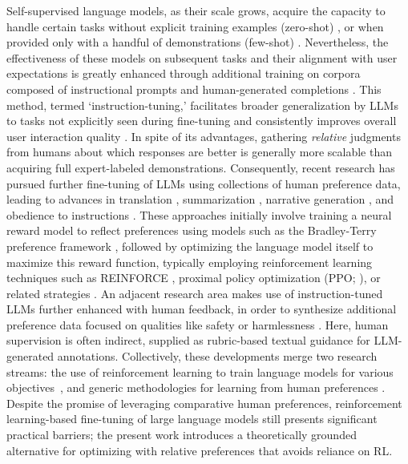 Self-supervised language models, as their scale grows, acquire the capacity to handle certain tasks without explicit training examples (zero-shot) \citep{radford2019language}, or when provided only with a handful of demonstrations (few-shot) \citep{gpt3,megatron,chowdhery2022palm}. Nevertheless, the effectiveness of these models on subsequent tasks and their alignment with user expectations is greatly enhanced through additional training on corpora composed of instructional prompts and human-generated completions \citep{mishra-etal-2022-cross,sanh2022multitask,chung2022scaling,thoppilan2022lamda}. This method, termed `instruction-tuning,’ facilitates broader generalization by LLMs to tasks not explicitly seen during fine-tuning and consistently improves overall user interaction quality \citep{chung2022scaling}. In spite of its advantages, gathering \textit{relative} judgments from humans about which responses are better is generally more scalable than acquiring full expert-labeled demonstrations. Consequently, recent research has pursued further fine-tuning of LLMs using collections of human preference data, leading to advances in translation \citep{kreutzer-etal-2018-reliability}, summarization \citep{stiennon2022learning,ziegler2020finetuning}, narrative generation \citep{ziegler2020finetuning}, and obedience to instructions \citep{ouyang2022training,ramamurthy2023is}. These approaches initially involve training a neural reward model to reflect preferences using models such as the Bradley-Terry preference framework \citep{bradley1952rankanalysis}, followed by optimizing the language model itself to maximize this reward function, typically employing reinforcement learning techniques such as REINFORCE \citep{williams1992reinforce}, proximal policy optimization (PPO; \cite{schulman2017proximal}), or related strategies \citep{ramamurthy2023is}. An adjacent research area makes use of instruction-tuned LLMs further enhanced with human feedback, in order to synthesize additional preference data focused on qualities like safety or harmlessness \citep{bai2022constitutional}. Here, human supervision is often indirect, supplied as rubric-based textual guidance for LLM-generated annotations. Collectively, these developments merge two research streams: the use of reinforcement learning to train language models for various objectives~\citep{Ranzato2015SequenceLT,paulus2018a,wu2018learning}, and generic methodologies for learning from human preferences \citep{christiano2017deep,kupcsik2018learning}. Despite the promise of leveraging comparative human preferences, reinforcement learning-based fine-tuning of large language models still presents significant practical barriers; the present work introduces a theoretically grounded alternative for optimizing with relative preferences that avoids reliance on RL.

